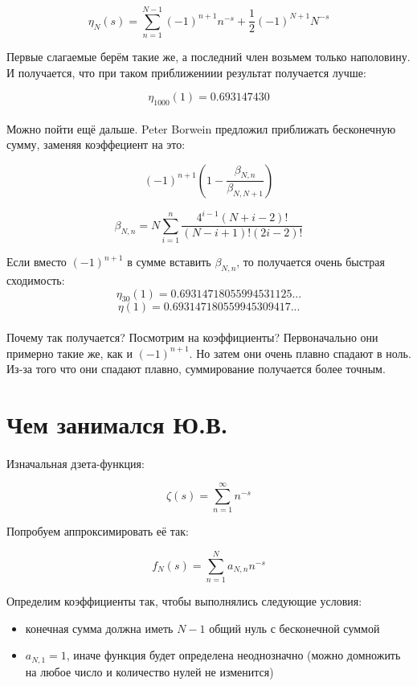 \documentclass{article}
\begin{document}
$$
    \eta_N(s) = \sum_{n=1}^{N-1} (-1)^{n+1} n^{-s} + \frac{1}{2}(-1)^{N+1} N^{-s}
$$

Первые слагаемые берём такие же, а последний член возьмем только наполовину.
И получается, что при таком приближениии результат получается лучше:

$$ \eta_{1000}(1) = 0.693147430 $$

\paragraph{}
Можно пойти ещё дальше. Peter Borwein предложил приближать бесконечную сумму,
заменяя коэффециент на это:

$$
    (-1)^{n+1} (1 - \frac{\beta_{N,n}}{\beta_{N,N+1}})
$$

$$
    \beta_{N,n} = N \sum_{i=1}^{n} \frac{4^{i-1} (N + i - 2)!}{(N - i + 1)! (2i - 2)!}
$$

Если вместо $(-1)^{n+1}$ в сумме вставить $\beta_{N,n}$, то получается очень
быстрая сходимость:
$$\eta_{30}(1) = 0.69314718055994531125...$$
$$\eta(1) = 0.693147180559945309417...$$

\paragraph{}
Почему так получается? Посмотрим на коэффициенты?
Первоначально они примерно такие же, как и $(-1)^{n+1}$. Но затем они очень плавно
спадают в ноль. Из-за того что они спадают плавно, суммирование получается более точным.

\section{Чем занимался Ю.В.}

\paragraph{}
Изначальная дзета-функция:

$$
    \zeta(s) = \sum_{n=1}^{\infty} n^{-s}
$$

Попробуем аппроксимировать её так:

$$
    f_N(s) = \sum_{n=1}^{N} a_{N,n} n^{-s}
$$

Определим коэффициенты так, чтобы выполнялись следующие условия:

\begin{itemize}
    \item конечная сумма должна иметь $N - 1$ общий нуль с бесконечной суммой
    \item $a_{N,1} = 1$, иначе функция будет определена неоднозначно
    (можно домножить на любое число и количество нулей не изменится)
\end{itemize}
\end{document}

